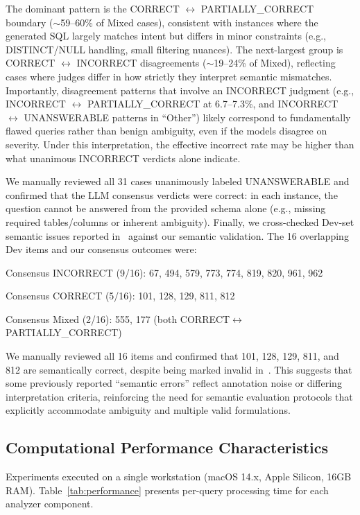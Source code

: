 \documentclass[]{einformatica}
\begin{document}
The dominant pattern is the CORRECT $\leftrightarrow$ PARTIALLY\_CORRECT boundary ($\sim$59--60\% of Mixed cases), consistent with instances where the generated SQL largely matches intent but differs in minor constraints (e.g., DISTINCT/NULL handling, small filtering nuances). The next-largest group is CORRECT $\leftrightarrow$ INCORRECT disagreements ($\sim$19--24\% of Mixed), reflecting cases where judges differ in how strictly they interpret semantic mismatches. Importantly, disagreement patterns that involve an INCORRECT judgment (e.g., INCORRECT $\leftrightarrow$ PARTIALLY\_CORRECT at 6.7--7.3\%, and INCORRECT $\leftrightarrow$ UNANSWERABLE patterns in ``Other'') likely correspond to fundamentally flawed queries rather than benign ambiguity, even if the models disagree on severity. Under this interpretation, the effective incorrect rate may be higher than what unanimous INCORRECT verdicts alone indicate.

We manually reviewed all 31 cases unanimously labeled UNANSWERABLE and confirmed that the LLM consensus verdicts were correct: in each instance, the question cannot be answered from the provided schema alone (e.g., missing required tables/columns or inherent ambiguity). Finally, we cross-checked Dev-set semantic issues reported in~\cite{liu2025nl2sqlbugs} against our semantic validation. The 16 overlapping Dev items and our consensus outcomes were:

Consensus INCORRECT (9/16): 67, 494, 579, 773, 774, 819, 820, 961, 962

Consensus CORRECT (5/16): 101, 128, 129, 811, 812

Consensus Mixed (2/16): 555, 177 (both CORRECT$\leftrightarrow$PARTIALLY\_CORRECT)

We manually reviewed all 16 items and confirmed that 101, 128, 129, 811, and 812 are semantically correct, despite being marked invalid in~\cite{liu2025nl2sqlbugs}. This suggests that some previously reported ``semantic errors'' reflect annotation noise or differing interpretation criteria, reinforcing the need for semantic evaluation protocols that explicitly accommodate ambiguity and multiple valid formulations.

\subsection{Computational Performance Characteristics}\label{sec:performance}

Experiments executed on a single workstation (macOS 14.x, Apple Silicon, 16GB RAM). Table~\ref{tab:performance} presents per-query processing time for each analyzer component.
\end{document}
